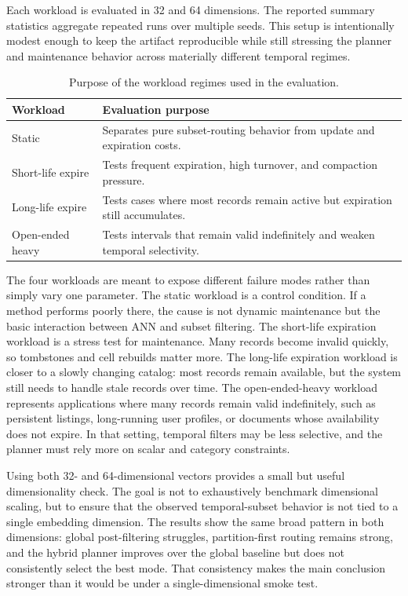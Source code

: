 \documentclass[sigconf,nonacm]{acmart}
\begin{document}
Each workload is evaluated in 32 and 64 dimensions. The reported summary statistics aggregate repeated runs over multiple seeds. This setup is intentionally modest enough to keep the artifact reproducible while still stressing the planner and maintenance behavior across materially different temporal regimes.

\begin{table}[t]
\caption{Purpose of the workload regimes used in the evaluation.}
\label{tab:workloads}
\centering
\small
\begin{tabular}{p{2.4cm}p{4.7cm}}
\toprule
Workload & Evaluation purpose \\
\midrule
Static & Separates pure subset-routing behavior from update and expiration costs. \\
Short-life expire & Tests frequent expiration, high turnover, and compaction pressure. \\
Long-life expire & Tests cases where most records remain active but expiration still accumulates. \\
Open-ended heavy & Tests intervals that remain valid indefinitely and weaken temporal selectivity. \\
\bottomrule
\end{tabular}
\end{table}

The four workloads are meant to expose different failure modes rather than simply vary one parameter. The static workload is a control condition. If a method performs poorly there, the cause is not dynamic maintenance but the basic interaction between ANN and subset filtering. The short-life expiration workload is a stress test for maintenance. Many records become invalid quickly, so tombstones and cell rebuilds matter more. The long-life expiration workload is closer to a slowly changing catalog: most records remain available, but the system still needs to handle stale records over time. The open-ended-heavy workload represents applications where many records remain valid indefinitely, such as persistent listings, long-running user profiles, or documents whose availability does not expire. In that setting, temporal filters may be less selective, and the planner must rely more on scalar and category constraints.

Using both 32- and 64-dimensional vectors provides a small but useful dimensionality check. The goal is not to exhaustively benchmark dimensional scaling, but to ensure that the observed temporal-subset behavior is not tied to a single embedding dimension. The results show the same broad pattern in both dimensions: global post-filtering struggles, partition-first routing remains strong, and the hybrid planner improves over the global baseline but does not consistently select the best mode. That consistency makes the main conclusion stronger than it would be under a single-dimensional smoke test.
\end{document}
